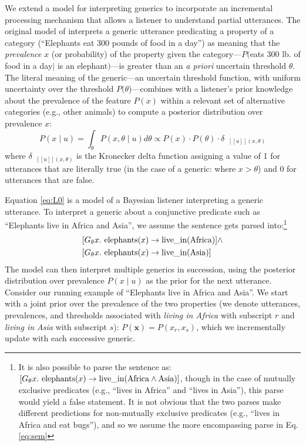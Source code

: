 \documentclass[10pt,letterpaper]{article}
\newcommand{\denote}[1]{\mbox{ $[\![ #1 ]\!]$}}
\begin{document}
We extend a model for interpreting generics to incorporate an incremental processing mechanism that allows a listener to understand partial utterances.
The original model of  interprets a generic utterance predicating a property of a category (``Elephants eat 300 pounds of food in a day'') as meaning that the \emph{prevalence} $x$ (or probability) of the property given the category---$P($eats 300 lb. of food in a day$\mid$ is an elephant$)$---is greater than an \emph{a priori} uncertain threshold $\theta$.
The literal meaning of the generic---an uncertain threshold function, with uniform uncertainty over the threshold $P(\theta$)---combines with a listener's prior knowledge about the prevalence of the feature $P(x)$ within a relevant set of alternative categories (e.g., other animals) to compute a posterior distribution over prevalence $x$:
\begin{equation}
P(x \mid u) = \int_{\theta} P(x, \theta \mid u)  d\theta \propto P(x) \cdot P(\theta) \cdot \delta_{\denote{u}(x, \theta)} 
\label{eq:L0}
\end{equation}
\noindent where $\delta_{\denote{u}(x, \theta)}$ is the Kronecker delta function assigning a value of 1 for utterances that are literally true (in the case of a generic: where $x > \theta$) and 0 for utterances that are false.



Equation \ref{eq:L0} is a model of a Bayesian listener interpreting a generic utterance.
To interpret a generic about a conjunctive predicate such as ``Elephants live in Africa and Asia'', we assume the sentence gets parsed into:\footnote{
It is also possible to parse the sentence as:
 $[G_\theta x. \textnormal{ elephants}(x) \to \textnormal{live\_in}(\textnormal{Africa} \land \textnormal{Asia})]$, though in the case of mutually exclusive predicates (e.g., ``lives in Africa'' and ``lives in Asia''), this parse would yield a false statement. It is not obvious that the two parses make different predictions for non-mutually exclusive predicates (e.g., ``lives in Africa and eat bugs''), and so we assume the more encompassing parse in Eq. \ref{eq:sem}
}
\begin{equation}
\begin{split}
[G_\theta x. \textnormal{ elephants}(x)& \to \textnormal{live\_in}(\textnormal{Africa})] \land \\
[G_\theta x. \textnormal{ elephants}(x)& \to \textnormal{live\_in}(\textnormal{Asia})] 
\end{split}
\label{eq:sem}
\end{equation}
The model can then interpret multiple generics in succession, using the posterior distribution over prevalence $P(x \mid u)$ as the prior for the next utterance. 
Consider our running example of ``Elephants live in Africa and Asia''.
We start with a joint prior over the prevalence of the two properties (we denote utterances, prevalences, and thresholds associated with \emph{living in Africa} with subscript $r$ and \emph{living in Asia} with subscript $s$): $P(\textbf{x}) = P(x_{r}, x_{s})$, which we incrementally update with each successive generic. 
\end{document}
